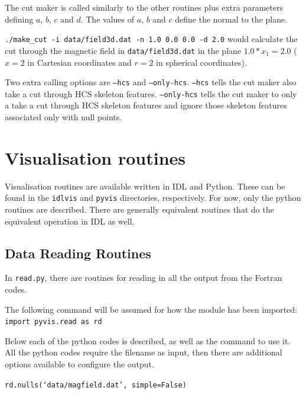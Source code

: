 \documentclass[12pt]{article}
\begin{document}
    The cut maker is called similarly to the other routines plus extra parameters defining \( a \), \( b \), \( c \) and \( d \). The values of \( a \), \( b \) and \( c \) define the normal to the plane.

    \texttt{./make\_cut -i data/field3d.dat -n 1.0 0.0 0.0 -d 2.0}
    would calculate the cut through the magnetic field in \texttt{data/field3d.dat} in the plane \( 1.0*x_1 = 2.0 \) (\( x = 2 \) in Cartesian coordinates and \( r = 2 \) in spherical coordinates).

    Two extra calling options are \texttt{--hcs} and \texttt{--only-hcs}. \texttt{--hcs} tells the cut maker also take a cut through HCS skeleton features. \texttt{--only-hcs} tells the cut maker to only a take a cut through HCS skeleton features and ignore those skeleton features associated only with null points.

  \section{Visualisation routines}
    \label{sec:vis}

    Visualisation routines are available written in IDL and Python. These can be found in the \texttt{idlvis} and \texttt{pyvis} directories, respectively. For now, only the python routines are described. There are generally equivalent routines that do the equivalent operation in IDL as well.

    \subsection{Data Reading Routines}

      In \texttt{read.py}, there are routines for reading in all the output from the Fortran codes.

      The following command will be assumed for how the module has been imported:
      \texttt{import pyvis.read as rd}

      Below each of the python codes is described, as well as the command to use it. All the python codes require the filename as input, then there are additional options available to configure the output.

      \texttt{rd.nulls(`data/magfield.dat', simple=False)}
\end{document}
